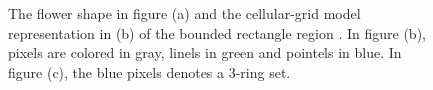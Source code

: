 \begin{figure}[]
{	}\hspace{20pt}%
	\caption{The flower shape in figure (a) and the cellular-grid model representation in (b) of the  bounded  rectangle region . In figure (b), pixels are colored in gray, linels in green and pointels in blue. In figure (c), the blue pixels denotes a $3$-ring set.}
\end{figure}

